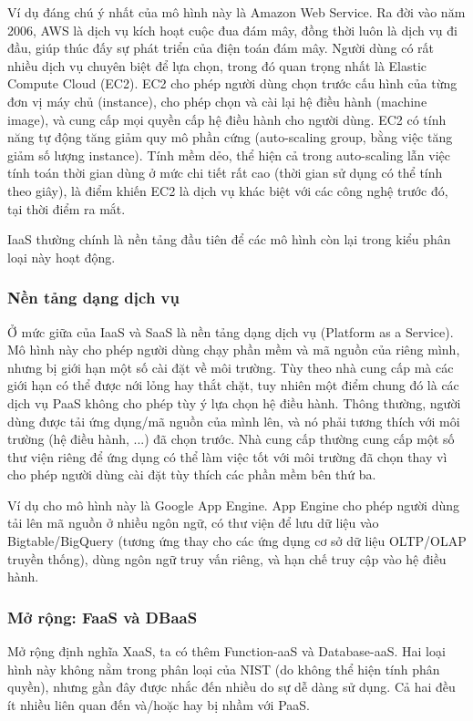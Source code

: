 \documentclass{article}
\begin{document}
Ví dụ đáng chú ý nhất của mô hình này là Amazon Web Service. Ra đời vào năm
2006, AWS là dịch vụ kích hoạt cuộc đua đám mây, đồng thời luôn là dịch vụ đi
đầu, giúp thúc đấy sự phát triển của điện toán đám mây. Người dùng có rất nhiều
dịch vụ chuyên biệt để lựa chọn, trong đó quan trọng nhất là Elastic Compute
Cloud (EC2). EC2 cho phép người dùng chọn trước cấu hình của từng đơn vị máy chủ
(instance), cho phép chọn và cài lại hệ điều hành (machine image), và cung cấp
mọi quyền cấp hệ điều hành cho người dùng. EC2 có tính năng tự động tăng giảm
quy mô phần cứng (auto-scaling group, bằng việc tăng giảm số lượng instance).
Tính mềm dẻo, thể hiện cả trong auto-scaling lẫn việc tính toán thời gian dùng ở
mức chi tiết rất cao (thời gian sử dụng có thể tính theo giây), là điểm khiến
EC2 là dịch vụ khác biệt với các công nghệ trước đó, tại thời điểm ra mắt.

IaaS thường chính là nền tảng đầu tiên để các mô hình còn lại trong kiểu phân
loại này hoạt động.

\subsubsection{Nền tảng dạng dịch vụ}

Ở mức giữa của IaaS và SaaS là nền tảng dạng dịch vụ (Platform as a Service). Mô
hình này cho phép người dùng chạy phần mềm và mã nguồn của riêng mình, nhưng bị
giới hạn một số cài đặt về môi trường. Tùy theo nhà cung cấp mà các giới hạn có
thể được nới lỏng hay thắt chặt, tuy nhiên một điểm chung đó là các dịch vụ PaaS
không cho phép tùy ý lựa chọn hệ điều hành. Thông thường, người dùng được tải
ứng dụng/mã nguồn của mình lên, và nó phải tương thích với môi trường (hệ điều
hành, ...) đã chọn trước. Nhà cung cấp thường cung cấp một số thư viện riêng để
ứng dụng có thể làm việc tốt với môi trường đã chọn thay vì cho phép người dùng
cài đặt tùy thích các phần mềm bên thứ ba.

Ví dụ cho mô hình này là Google App Engine. App Engine cho phép người dùng tải
lên mã nguồn ở nhiều ngôn ngữ, có thư viện để lưu dữ liệu vào Bigtable/BigQuery
(tương ứng thay cho các ứng dụng cơ sở dữ liệu OLTP/OLAP truyền thống), dùng
ngôn ngữ truy vấn riêng, và hạn chế truy cập vào hệ điều hành.

\subsubsection{Mở rộng: FaaS và DBaaS}

Mở rộng định nghĩa XaaS, ta có thêm Function-aaS và Database-aaS. Hai loại hình
này không nằm trong phân loại của NIST (do không thể hiện tính phân quyền),
nhưng gần đây được nhắc đến nhiều do sự dễ dàng sử dụng. Cả hai đều ít nhiều
liên quan đến và/hoặc hay bị nhầm với PaaS.
\end{document}
